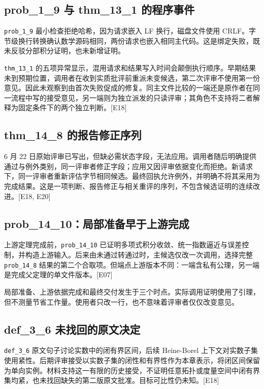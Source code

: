 \subsection[prob\_1\_9 与 thm\_13\_1 的程序事件]{\texorpdfstring{\protect\hypertarget{b8}{}prob\_1\_9 与 thm\_13\_1 的程序事件}{prob\_1\_9 与 thm\_13\_1 的程序事件}}
\nolinkurl{prob_1_9} 最小检查拒绝哈希，因为请求嵌入 LF 换行，磁盘文件使用 CRLF。字节级换行转换确认数学源码相同，两份请求也嵌入相同主代码。这是绑定失败，既未反驳分部积分证明，也未新增证明。

\nolinkurl{thm_13_1} 的五项异常显示，混用请求和结果写入时间会颠倒执行顺序。早期结果未到预期位置，调用者在收到实质批评前重派未变候选，第二次评审不使用第一份意见。因此未观察到由首次失败促成的修复。同主文件比较的一端还是原作者在同一流程中写的接受意见，另一端则为独立派发的只读评审；其角色不支持将二者解释为固定条件下的两个独立判断。[E18]

\subsection[thm\_14\_8 的报告修正序列]{\texorpdfstring{\protect\hypertarget{b9}{}thm\_14\_8 的报告修正序列}{thm\_14\_8 的报告修正序列}}
6 月 22 日原始评审已写出，但缺必需状态字段，无法应用。调用者随后明确提供通过与例外类别，同一评审者修正字段；应用又因评审依据变化而拒绝。新请求下，同一评审者重新评估字节相同候选。最终回执允许例外，并明确不将其采用为完成结果。这是一项判断、报告修正与相关重评的序列，不包含候选证明的连续改进。[E18, E20]

\subsection[prob\_14\_10：局部准备早于上游完成]{\texorpdfstring{\protect\hypertarget{b10}{}prob\_14\_10：局部准备早于上游完成}{prob\_14\_10：局部准备早于上游完成}}
上游定理完成前，\nolinkurl{prob_14_10} 已证明多项式积分收敛、统一指数逼近与误差控制，并构造上游输入。后来由未通过转通过时，主候选仅改一次调用，选择完整 \nolinkurl{prob_14_8} 结果的第二个合取项。但端点上游版本不同：一端含私有公理，另一端是完成父定理的单文件版本。[E07]

局部准备、上游依据完成和最终交付发生于三个时点。实际调用证明使用了引理，但不测量节省工作量。使用者只改一行，也不意味着评审者仅仅改变意见。

\subsection[def\_3\_6 未找回的原文决定]{\texorpdfstring{\protect\hypertarget{b11}{}def\_3\_6 未找回的原文决定}{def\_3\_6 未找回的原文决定}}
\nolinkurl{def_3_6} 原文句子讨论实数中的闭有界区间，后续 Heine-Borel 上下文对实数子集使用紧性。后期评审接受以实数子集的闭性和有界性作为本章表示，将闭区间保留为单向实例。材料支持这一有限的历史接受，不证明任意拓扑或度量空间中闭有界集均紧，也未找回缺失的第二版原文批准。目标可比性仍未知。[E18]

